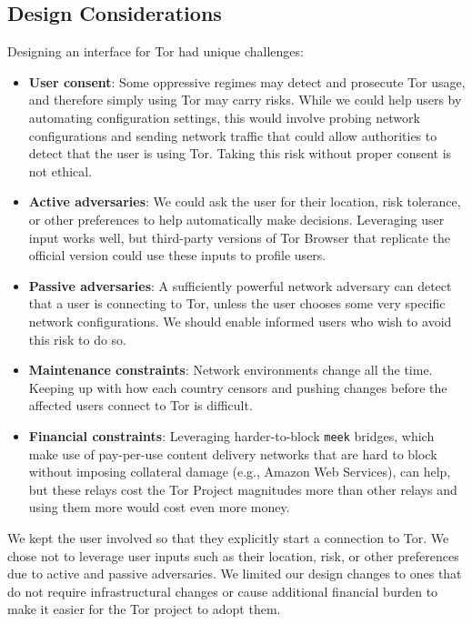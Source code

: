 \documentclass[USenglish,oneside,twocolumn]{article}
\begin{document}
\subsection {Design Considerations} 

Designing an interface for Tor had unique challenges: \\

\begin{itemize}
\item {\bfseries User consent}: Some oppressive regimes may detect and prosecute Tor usage, and therefore simply using Tor may carry risks. While we could help users by automating configuration settings, this would involve probing network configurations and sending network traffic that could allow authorities to detect that the user is using Tor. Taking this risk without proper consent is not ethical. 

\item{\bfseries Active adversaries}: We could ask the user for their location, risk tolerance, or other preferences to help automatically make decisions. Leveraging user input works well, but third-party versions of Tor Browser that replicate the official version could use these inputs to profile users. 

\item {\bfseries Passive adversaries}: A sufficiently powerful network adversary can detect that a user is connecting to Tor, unless the user chooses some very specific network configurations. We should enable informed users who wish to avoid this risk to do so.

\item{\bfseries Maintenance constraints}: Network environments change all the time. Keeping up with how each country censors and pushing changes before the affected users connect to Tor is difficult.

\item{\bfseries Financial constraints}: Leveraging harder-to-block \texttt{meek} bridges, which make use of pay-per-use content delivery networks that are hard to block without imposing collateral damage (e.g., Amazon Web Services), can help, but these relays cost the Tor Project magnitudes more than other relays and using them more would cost even more money.
\end{itemize}

We kept the user involved so that they explicitly start a connection to Tor. We chose not to leverage user inputs such as their location, risk, or other preferences due to active and passive adversaries. We limited our design changes to ones that do not require infrastructural changes or cause additional financial burden to make it easier for the Tor project to adopt them.
\end{document}
